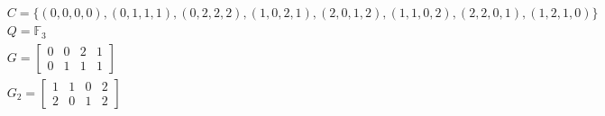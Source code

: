 \begin{example*}
\begin{align*}
&C=\{(0,0,0,0),(0,1,1,1),(0,2,2,2),(1,0,2,1),(2,0,1,2),(1,1,0,2),(2,2,0,1),(1,2,1,0)\}\\
&Q=\mathbb{F}_3\\
&G=\begin{bmatrix}
0&0&2&1\\0&1&1&1
\end{bmatrix}\\
&G_2=\begin{bmatrix}
1&1&0&2\\2&0&1&2
\end{bmatrix}
\end{align*}
\end{example*}

